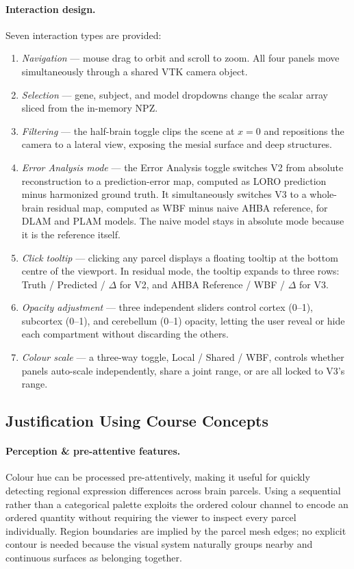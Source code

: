 \documentclass[11pt,letterpaper]{article}
\begin{document}
\paragraph{Interaction design.}
Seven interaction types are provided:
\begin{enumerate}[nosep]
  \item \emph{Navigation} — mouse drag to orbit and scroll to zoom.
        All four panels move simultaneously through a shared VTK camera object.
  \item \emph{Selection} — gene, subject, and model dropdowns change the
        scalar array sliced from the in-memory NPZ.
  \item \emph{Filtering} — the half-brain toggle clips the scene at $x=0$
        and repositions the camera to a lateral view, exposing the
        mesial surface and deep structures.
  \item \emph{Error Analysis mode} — the Error Analysis toggle switches V2
        from absolute reconstruction to a prediction-error map, computed as
        LORO prediction minus harmonized ground truth. It simultaneously
        switches V3 to a whole-brain residual map, computed as WBF minus
        naive AHBA reference, for DLAM and PLAM models. The naive model
        stays in absolute mode because it is the reference itself.
  \item \emph{Click tooltip} — clicking any parcel displays a floating
        tooltip at the bottom centre of the viewport. In residual mode, the
        tooltip expands to three rows: Truth / Predicted / $\Delta$ for V2,
        and AHBA Reference / WBF / $\Delta$ for V3.
  \item \emph{Opacity adjustment} — three independent sliders control
        cortex (0--1), subcortex (0--1), and cerebellum (0--1) opacity,
        letting the user reveal or hide each compartment without discarding
        the others.
  \item \emph{Colour scale} — a three-way toggle, Local / Shared / WBF,
        controls whether panels auto-scale independently, share a joint
        range, or are all locked to V3's range.
\end{enumerate}

\subsection{Justification Using Course Concepts}

\paragraph{Perception \& pre-attentive features.}
Colour hue can be processed pre-attentively, making it useful for quickly
detecting regional expression differences across brain parcels.
Using a sequential rather than a categorical palette exploits the ordered
colour channel to encode an ordered quantity without requiring the viewer to
inspect every parcel individually.
Region boundaries are implied by the parcel mesh edges; no explicit contour is
needed because the visual system naturally groups nearby and continuous surfaces
as belonging together.
\end{document}
